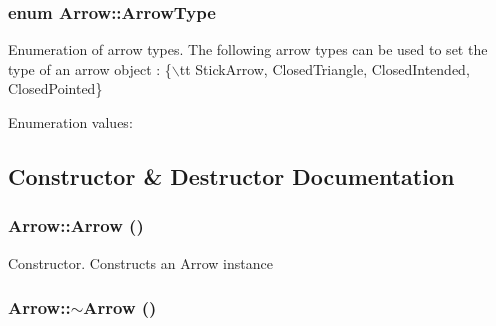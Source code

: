 \subsubsection{\setlength{\rightskip}{0pt plus 5cm}enum Arrow::Arrow\-Type}\label{classArrow_s6}


Enumeration of arrow types. The following arrow types can be used to set the type of an arrow object : \{$\backslash$tt Stick\-Arrow, Closed\-Triangle, Closed\-Intended, Closed\-Pointed\} \begin{Desc}
\item[Enumeration values: ]\par
\begin{description}
\item[{\em 
{\em Stick\-Arrow}\label{classArrow_s6s0}
}]\item[{\em 
{\em Closed\-Triangle}\label{classArrow_s6s1}
}]\item[{\em 
{\em Closed\-Intended}\label{classArrow_s6s2}
}]\item[{\em 
{\em Closed\-Pointed}\label{classArrow_s6s3}
}]\end{description}
\end{Desc}



\subsection{Constructor \& Destructor Documentation}
\subsubsection{\setlength{\rightskip}{0pt plus 5cm}Arrow::Arrow ()}\label{classArrow_a0}


Constructor. Constructs an Arrow instance 
\subsubsection{\setlength{\rightskip}{0pt plus 5cm}Arrow::$\sim$Arrow ()}\label{classArrow_a1}


